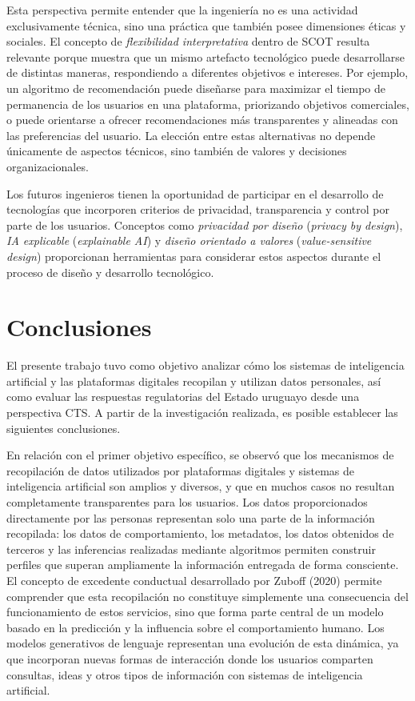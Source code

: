 \documentclass[11pt,a4paper]{article}
\begin{document}
Esta perspectiva permite entender que la ingeniería no es una actividad exclusivamente técnica, sino una práctica que también posee dimensiones éticas y sociales. El concepto de \textit{flexibilidad interpretativa} dentro de SCOT resulta relevante porque muestra que un mismo artefacto tecnológico puede desarrollarse de distintas maneras, respondiendo a diferentes objetivos e intereses. Por ejemplo, un algoritmo de recomendación puede diseñarse para maximizar el tiempo de permanencia de los usuarios en una plataforma, priorizando objetivos comerciales, o puede orientarse a ofrecer recomendaciones más transparentes y alineadas con las preferencias del usuario. La elección entre estas alternativas no depende únicamente de aspectos técnicos, sino también de valores y decisiones organizacionales.

Los futuros ingenieros tienen la oportunidad de participar en el desarrollo de tecnologías que incorporen criterios de privacidad, transparencia y control por parte de los usuarios. Conceptos como \textit{privacidad por diseño} (\textit{privacy by design}), \textit{IA explicable} (\textit{explainable AI}) y \textit{diseño orientado a valores} (\textit{value-sensitive design}) proporcionan herramientas para considerar estos aspectos durante el proceso de diseño y desarrollo tecnológico.

\section{Conclusiones}

El presente trabajo tuvo como objetivo analizar cómo los sistemas de inteligencia artificial y las plataformas digitales recopilan y utilizan datos personales, así como evaluar las respuestas regulatorias del Estado uruguayo desde una perspectiva CTS. A partir de la investigación realizada, es posible establecer las siguientes conclusiones.

En relación con el primer objetivo específico, se observó que los mecanismos de recopilación de datos utilizados por plataformas digitales y sistemas de inteligencia artificial son amplios y diversos, y que en muchos casos no resultan completamente transparentes para los usuarios. Los datos proporcionados directamente por las personas representan solo una parte de la información recopilada: los datos de comportamiento, los metadatos, los datos obtenidos de terceros y las inferencias realizadas mediante algoritmos permiten construir perfiles que superan ampliamente la información entregada de forma consciente. El concepto de excedente conductual desarrollado por Zuboff (2020) permite comprender que esta recopilación no constituye simplemente una consecuencia del funcionamiento de estos servicios, sino que forma parte central de un modelo basado en la predicción y la influencia sobre el comportamiento humano. Los modelos generativos de lenguaje representan una evolución de esta dinámica, ya que incorporan nuevas formas de interacción donde los usuarios comparten consultas, ideas y otros tipos de información con sistemas de inteligencia artificial.
\end{document}
